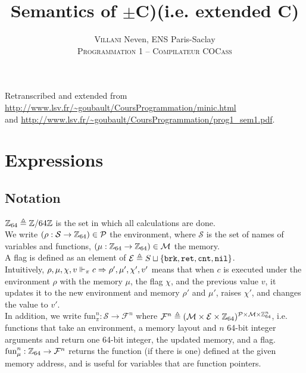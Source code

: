 

\newcommand{\Cmp}{\(\pm\)C)}
\newcommand{\Cmm}{C\textminus\textminus}
\newcommand{\fun}{\text{fun}_\pi^n}
\newcommand{\fnptr}{\text{fun}_\mu^n}
\newcommand{\gives}{\vdash_\pi}

\title{Semantics of \Cmp (i.e. extended \Cmm)}
\author{\textsc{Villani} Neven, ENS Paris-Saclay\\\textsc{Programmation 1 -- Compilateur COCass}}


\maketitle

Retranscribed and extended from \url{http://www.lsv.fr/~goubault/CoursProgrammation/minic.html}\\
and \url{http://www.lsv.fr/~goubault/CoursProgrammation/prog1_sem1.pdf}.\\


\section{Expressions}

\subsection*{Notation}

\(\mathbb{Z}_{64}\triangleq \mathbb{Z}/64\mathbb{Z}\) is the set in which all calculations are done.\\

We write \((\rho: \mathcal{S}\to\mathbb{Z}_{64})\in \mathcal{P}\) the environment, where \(\mathcal{S}\) is the set of names of variables and functions, \((\mu: \mathbb{Z}_{64}\to\mathbb{Z}_{64})\in \mathcal{M}\) the memory.\\

A flag is defined as an element of \(\mathcal{E} \triangleq S \sqcup \{ \texttt{brk}, \texttt{ret}, \texttt{cnt}, \texttt{nil} \}\).\\
Intuitively, \(\rho,\mu,\chi,v \Vdash_\pi c \Rightarrow \rho',\mu',\chi',v'\) means that when \(c\) is executed under the environment \(\rho\) with the memory \(\mu\), the flag \(\chi\), and the previous value \(v\), it updates it to the new environment and memory \(\rho'\) and \(\mu'\), raises \(\chi'\), and changes the value to \(v'\).\\

In addition, we write \(\fun: \mathcal{S}\to \mathcal{F}^n\) where \(\mathcal{F}^n \triangleq (\mathcal{M} \times \mathcal{E} \times \mathbb{Z}_{64})^{\mathcal{P} \times \mathcal{M} \times \mathbb{Z}_{64}^n}\), i.e. functions that take an environment, a memory layout and \(n\) 64-bit integer arguments and return one 64-bit integer, the updated memory, and a flag.\\
\(\fnptr: \ZZ_{64}\to \mathcal{F}^n\) returns the function (if there is one) defined at the given memory address, and is useful for variables that are function pointers.\\

